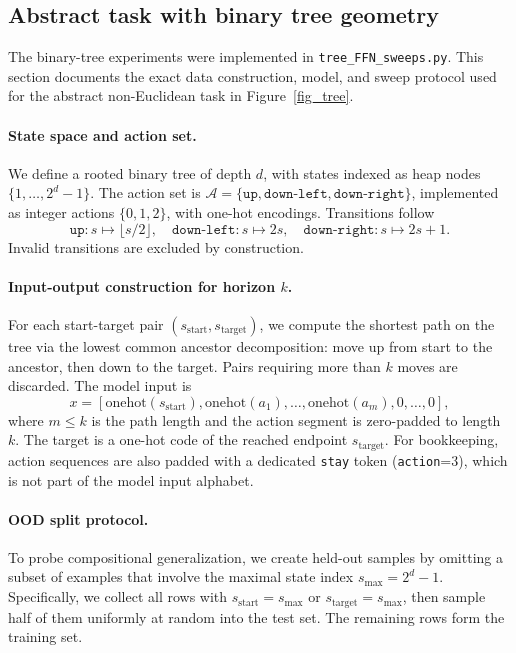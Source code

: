 \documentclass{article}
\begin{document}
\subsection{Abstract task with binary tree geometry}
\label{sec:appendix_tree_geometry}
The binary-tree experiments were implemented in \texttt{tree\_FFN\_sweeps.py}.
This section documents the exact data construction, model, and sweep protocol used
for the abstract non-Euclidean task in Figure~\ref{fig_tree}.

\paragraph{State space and action set.}
We define a rooted binary tree of depth \(d\), with states indexed as heap nodes
\(\{1,\dots,2^d-1\}\). The action set is
\(\mathcal{A}=\{\texttt{up},\texttt{down-left},\texttt{down-right}\}\),
implemented as integer actions \(\{0,1,2\}\), with one-hot encodings.
Transitions follow
\[
\texttt{up}: s \mapsto \lfloor s/2 \rfloor,\quad
\texttt{down-left}: s \mapsto 2s,\quad
\texttt{down-right}: s \mapsto 2s+1.
\]
Invalid transitions are excluded by construction.

\paragraph{Input-output construction for horizon \(k\).}
For each start-target pair \((s_{\mathrm{start}}, s_{\mathrm{target}})\), we compute the
shortest path on the tree via the lowest common ancestor decomposition:
move up from start to the ancestor, then down to the target.
Pairs requiring more than \(k\) moves are discarded.
The model input is
\[
x = [\mathrm{onehot}(s_{\mathrm{start}}), \mathrm{onehot}(a_1),\dots,\mathrm{onehot}(a_m), 0,\dots,0],
\]
where \(m\le k\) is the path length and the action segment is zero-padded to length \(k\).
The target is a one-hot code of the reached endpoint \(s_{\mathrm{target}}\).
For bookkeeping, action sequences are also padded with a dedicated \texttt{stay} token
(\texttt{action}=3), which is not part of the model input alphabet.

\paragraph{OOD split protocol.}
To probe compositional generalization, we create held-out samples by omitting a subset of examples
that involve the maximal state index \(s_{\max}=2^d-1\).
Specifically, we collect all rows with \(s_{\mathrm{start}}=s_{\max}\) or
\(s_{\mathrm{target}}=s_{\max}\), then sample half of them uniformly at random into the test set.
The remaining rows form the training set.
\end{document}

